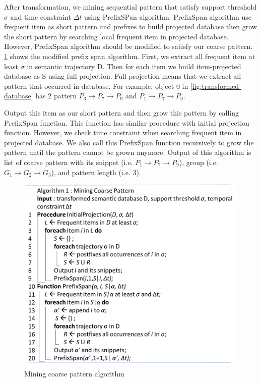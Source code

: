 \documentclass[conference]{IEEEtran}
\begin{document}
After transformation, we mining sequential pattern that satisfy support threshold $\sigma$ and time constraint $\Delta t$ using PrefixSPan algorithm. PrefixSpan algorithm use frequent item as short pattern and prefixes to build projected database then grow the short pattern by searching local frequent item in projected database. However, PrefixSpan algorithm should be modified to satisfy our coarse pattern. \ref{fig:mining-coarse-pattern} shows the modified prefix span algorithm. First, we extract all frequent item at least $\sigma$ in semantic trajectory D. Then for each item we build item-projected database as S using full projection. Full projection means that we extract all pattern that occurred in database. For example, object 0 in \ref{fig:transformed-database} has 2 pattern $P_{3}\rightarrow P_{7}\rightarrow P_{9}$ and $P_{1}\rightarrow P_{7}\rightarrow P_{9}$.
\par
Output this item as our short pattern and then grow this pattern by calling PrefixSpan function. This function has similar procedure with initial projection function. However, we check time constraint when searching frequent item in projected database. We also call this PrefixSpan function recursively to grow the pattern until the pattern cannot be grown anymore. Output of this algorithm is list of coarse pattern with its snippet (i.e. $P_{1}\rightarrow P_{7}\rightarrow P_{9}$), group (i.e. $G_{1}\rightarrow G_{2}\rightarrow G_{3}$), and pattern length (i.e. 3).  

\begin{figure}[!ht]
	\centering
	\includegraphics[width=1.0\linewidth]{mining_coarse_pattern}
	\caption{Mining coarse pattern algorithm \cite{zhang2014splitter}}
	\label{fig:mining-coarse-pattern}
\end{figure}
\end{document}
